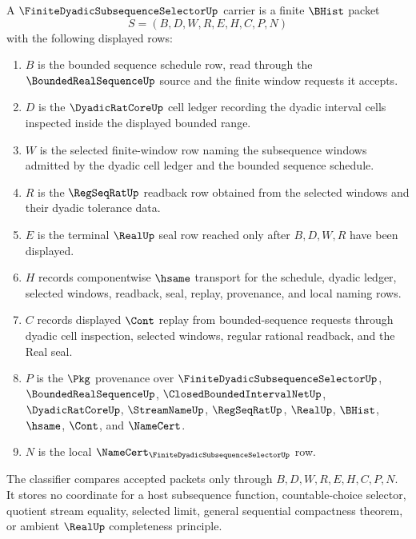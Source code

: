 \begin{definition}
\label{def:finite-dyadic-subsequence-selector-carrier}
A $\FiniteDyadicSubsequenceSelectorUp$ carrier is a finite $\BHist$ packet
$$
S=(B,D,W,R,E,H,C,P,N)
$$
with the following displayed rows:
\begin{enumerate}
\item $B$ is the bounded sequence schedule row, read through the $\BoundedRealSequenceUp$ source and the finite window requests it accepts.
\item $D$ is the $\DyadicRatCoreUp$ cell ledger recording the dyadic interval cells inspected inside the displayed bounded range.
\item $W$ is the selected finite-window row naming the subsequence windows admitted by the dyadic cell ledger and the bounded sequence schedule.
\item $R$ is the $\RegSeqRatUp$ readback row obtained from the selected windows and their dyadic tolerance data.
\item $E$ is the terminal $\RealUp$ seal row reached only after $B,D,W,R$ have been displayed.
\item $H$ records componentwise $\hsame$ transport for the schedule, dyadic ledger, selected windows, readback, seal, replay, provenance, and local naming rows.
\item $C$ records displayed $\Cont$ replay from bounded-sequence requests through dyadic cell inspection, selected windows, regular rational readback, and the Real seal.
\item $P$ is the $\Pkg$ provenance over $\FiniteDyadicSubsequenceSelectorUp$, $\BoundedRealSequenceUp$, $\ClosedBoundedIntervalNetUp$, $\DyadicRatCoreUp$, $\StreamNameUp$, $\RegSeqRatUp$, $\RealUp$, $\BHist$, $\hsame$, $\Cont$, and $\NameCert$.
\item $N$ is the local $\NameCert_{\FiniteDyadicSubsequenceSelectorUp}$ row.
\end{enumerate}
The classifier compares accepted packets only through $B,D,W,R,E,H,C,P,N$. It stores no coordinate for a host subsequence function, countable-choice selector, quotient stream equality, selected limit, general sequential compactness theorem, or ambient $\RealUp$ completeness principle.
\end{definition}


